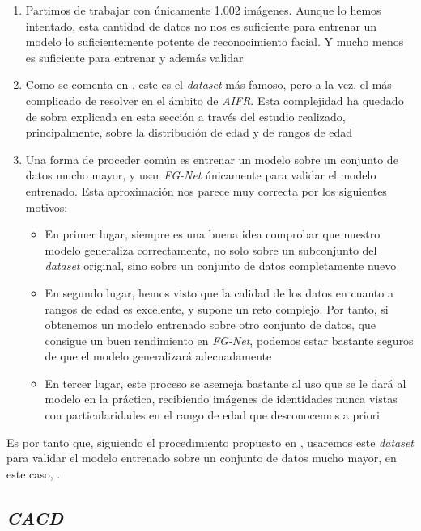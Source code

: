 \begin{enumerate}
    \item Partimos de trabajar con únicamente 1.002 imágenes. Aunque lo hemos intentado, esta cantidad de datos no nos es suficiente para entrenar un modelo lo suficientemente potente de reconocimiento facial. Y mucho menos es suficiente para entrenar y además validar
    \item Como se comenta en \cite{informatica:best_fgnet_model}, este es el \textit{dataset} más famoso, pero a la vez, el más complicado de resolver en el ámbito de \textit{AIFR}. Esta complejidad ha quedado de sobra explicada en esta sección a través del estudio realizado, principalmente, sobre la distribución de edad y de rangos de edad
    \item Una forma de proceder común \cite{informatica:best_fgnet_model} es entrenar un modelo sobre un conjunto de datos mucho mayor, y usar \textit{FG-Net} únicamente para validar el modelo entrenado. Esta aproximación nos parece muy correcta por los siguientes motivos:
        \begin{itemize}
            \item En primer lugar, siempre es una buena idea comprobar que nuestro modelo generaliza correctamente, no solo sobre un subconjunto del \textit{dataset} original, sino sobre un conjunto de datos completamente nuevo
            \item En segundo lugar, hemos visto que la calidad de los datos en cuanto a rangos de edad es excelente, y supone un reto complejo. Por tanto, si obtenemos un modelo entrenado sobre otro conjunto de datos, que consigue un buen rendimiento en \textit{FG-Net}, podemos estar bastante seguros de que el modelo generalizará adecuadamente
            \item En tercer lugar, este proceso se asemeja bastante al uso que se le dará al modelo en la práctica, recibiendo imágenes de identidades nunca vistas con particularidades en el rango de edad que desconocemos a priori
        \end{itemize}
\end{enumerate}

Es por tanto que, siguiendo el procedimiento propuesto en \cite{informatica:best_fgnet_model}, usaremos este \textit{dataset} para validar el modelo entrenado sobre un conjunto de datos mucho mayor, en este caso, .

\subsection{\textit{CACD}} \label{isec:dataset_cacd}

